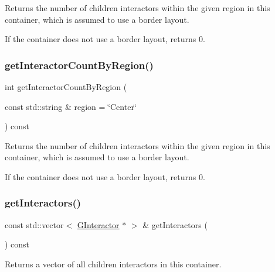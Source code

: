 Returns the number of children interactors within the given region in this container, which is assumed to use a border layout. 

If the container does not use a border layout, returns 0. \mbox{\label{classGContainer_ab51dbb723159efca4fc89e2c4211610c}} 
\subsubsection{\texorpdfstring{get\+Interactor\+Count\+By\+Region()}{getInteractorCountByRegion()}\hspace{0.1cm}{\footnotesize\ttfamily [2/2]}}
{\footnotesize\ttfamily int get\+Interactor\+Count\+By\+Region (\begin{DoxyParamCaption}\item[{const std\+::string \&}]{region = {\ttfamily \char`\"{}Center\char`\"{}} }\end{DoxyParamCaption}) const\hspace{0.3cm}{\ttfamily [virtual]}}



Returns the number of children interactors within the given region in this container, which is assumed to use a border layout. 

If the container does not use a border layout, returns 0. \mbox{\label{classGContainer_a04512d7151516f8a9e7298d72a290008}} 
\subsubsection{\texorpdfstring{get\+Interactors()}{getInteractors()}}
{\footnotesize\ttfamily const std\+::vector$<$ \mbox{\hyperlink{classGInteractor}{G\+Interactor}} $\ast$ $>$ \& get\+Interactors (\begin{DoxyParamCaption}{ }\end{DoxyParamCaption}) const\hspace{0.3cm}{\ttfamily [virtual]}}



Returns a vector of all children interactors in this container. 

